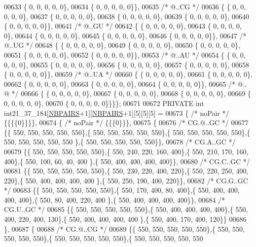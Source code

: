 \begin{DoxyCode}
00633 \{  0, 0, 0, 0, 0\},
00634 \{  0, 0, 0, 0, 0\}\},
00635  \textcolor{comment}{/*  @..CG */}
00636 \{ \{  0, 0, 0, 0, 0\},
00637 \{  0, 0, 0, 0, 0\},
00638 \{  0, 0, 0, 0, 0\},
00639 \{  0, 0, 0, 0, 0\},
00640 \{  0, 0, 0, 0, 0\}\},
00641  \textcolor{comment}{/*  @..GU */}
00642 \{ \{  0, 0, 0, 0, 0\},
00643 \{  0, 0, 0, 0, 0\},
00644 \{  0, 0, 0, 0, 0\},
00645 \{  0, 0, 0, 0, 0\},
00646 \{  0, 0, 0, 0, 0\}\},
00647  \textcolor{comment}{/*  @..UG */}
00648 \{ \{  0, 0, 0, 0, 0\},
00649 \{  0, 0, 0, 0, 0\},
00650 \{  0, 0, 0, 0, 0\},
00651 \{  0, 0, 0, 0, 0\},
00652 \{  0, 0, 0, 0, 0\}\},
00653  \textcolor{comment}{/*  @..AU */}
00654 \{ \{  0, 0, 0, 0, 0\},
00655 \{  0, 0, 0, 0, 0\},
00656 \{  0, 0, 0, 0, 0\},
00657 \{  0, 0, 0, 0, 0\},
00658 \{  0, 0, 0, 0, 0\}\},
00659  \textcolor{comment}{/*  @..UA */}
00660 \{ \{  0, 0, 0, 0, 0\},
00661 \{  0, 0, 0, 0, 0\},
00662 \{  0, 0, 0, 0, 0\},
00663 \{  0, 0, 0, 0, 0\},
00664 \{  0, 0, 0, 0, 0\}\},
00665  \textcolor{comment}{/*  @.. @ */}
00666 \{ \{  0, 0, 0, 0, 0\},
00667 \{  0, 0, 0, 0, 0\},
00668 \{  0, 0, 0, 0, 0\},
00669 \{  0, 0, 0, 0, 0\},
00670 \{  0, 0, 0, 0, 0\}\}\}\};
00671 
00672 PRIVATE \textcolor{keywordtype}{int} int21\_37\_184[\hyperlink{constants_8h_a5e75221c779d618eab81e096f37e32ce}{NBPAIRS}+1][\hyperlink{constants_8h_a5e75221c779d618eab81e096f37e32ce}{NBPAIRS}+1][5][5][5] =
00673 \{ \textcolor{comment}{/* noPair */} \{\{\{\{0\}\}\}\},
00674 \{ \textcolor{comment}{/* noPair */} \{\{\{0\}\}\},
00675 \{
00676 \textcolor{comment}{/* CG.@..GC */}
00677 \{\{ 550, 550, 550, 550, 550\},\{ 550, 550, 550, 550, 550\},\{ 550, 550, 550, 550, 550\},\{ 550, 550, 550, 550, 550
      \},\{ 550, 550, 550, 550, 550\}\},
00678 \textcolor{comment}{/* CG.A..GC */}
00679 \{\{ 550, 550, 550, 550, 550\},\{ 550, 240, 220, 160, 400\},\{ 550, 210, 170, 160, 400\},\{ 550, 100,  60,  40, 400
      \},\{ 550, 400, 400, 400, 400\}\},
00680 \textcolor{comment}{/* CG.C..GC */}
00681 \{\{ 550, 550, 550, 550, 550\},\{ 550, 230, 220, 400, 220\},\{ 550, 220, 250, 400, 220\},\{ 550, 400, 400, 400, 400
      \},\{ 550, 250, 190, 400, 220\}\},
00682 \textcolor{comment}{/* CG.G..GC */}
00683 \{\{ 550, 550, 550, 550, 550\},\{ 550, 170, 400,  80, 400\},\{ 550, 400, 400, 400, 400\},\{ 550,  80, 400, 220, 400
      \},\{ 550, 400, 400, 400, 400\}\},
00684 \textcolor{comment}{/* CG.U..GC */}
00685 \{\{ 550, 550, 550, 550, 550\},\{ 550, 400, 400, 400, 400\},\{ 550, 400, 220, 400, 130\},\{ 550, 400, 400, 400, 400
      \},\{ 550, 400, 170, 400, 120\}\}
00686 \},
00687 \{
00688 \textcolor{comment}{/* CG.@..CG */}
00689 \{\{ 550, 550, 550, 550, 550\},\{ 550, 550, 550, 550, 550\},\{ 550, 550, 550, 550, 550\},\{ 550, 550, 550, 550, 550

\end{DoxyCode}
